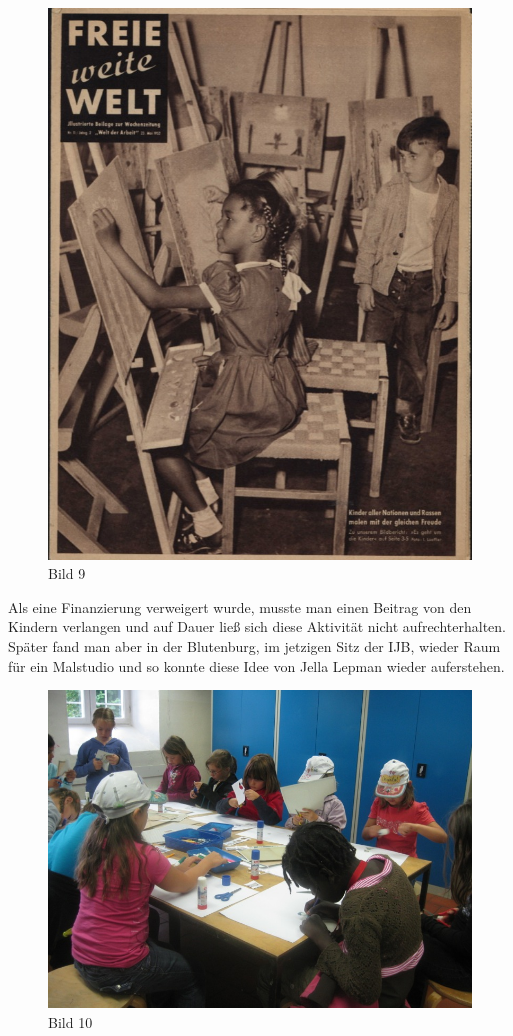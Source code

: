 \documentclass[a4paper,
fontsize=11pt,
oneside,
numbers=noperiodatend,
parskip=half-,
bibliography=totoc,
final
]{scrartcl}
\begin{document}
\begin{figure}[htbp]
\centering
\includegraphics{img/Bild9.jpg}
\caption{Bild 9}
\end{figure}

Als eine Finanzierung verweigert wurde, musste man einen Beitrag von den
Kindern verlangen und auf Dauer ließ sich diese Aktivität nicht
aufrechterhalten. Später fand man aber in der Blutenburg, im jetzigen
Sitz der IJB, wieder Raum für ein Malstudio und so konnte diese Idee von
Jella Lepman wieder auferstehen.

\begin{figure}[htbp]
\centering
\includegraphics{img/Bild10.jpg}
\caption{Bild 10}
\end{figure}
\end{document}
